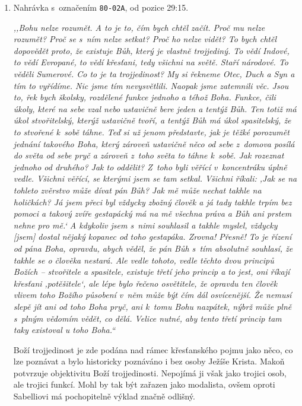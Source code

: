 \begin{enumerate}

\item{%
Nahrávka s~označením \texttt{80-02A}, od pozice 29:15.

\textit{%
,,Bohu nelze rozumět. A to je to, čím bych chtěl začít. Proč mu nelze rozumět?
Proč se s~ním
nelze setkat? Proč ho nelze vidět? To bych chtěl dopovědět proto, že existuje
Bůh,
který je vlastně trojjediný. To vědí Indové, to vědí Evropané, to vědí křesťani,
tedy všichni na světě. Staří národové. To věděli Sumerové. Co to je ta
trojjedinost? My si řekneme Otec, Duch a Syn a tím to
vyřídíme. Nic jsme tím nevysvětlili. Naopak jsme zatemnili věc. Jsou to, řek bych
školsky, rozdělené funkce jednoho a téhož Boha. Funkce, čili úkoly, které na sebe
vzal nebo ustavičně bere jeden a tentýž Bůh. Ten totiž má úkol stvořitelský,
kterýž ustavičně tvoří, a tentýž Bůh má úkol spasitelský, že to stvořené k~sobě
táhne. Teď si už jenom představte, jak je těžké porozumět jednání takového Boha,
který zároveň ustavičně něco od sebe z~domova posílá do světa od sebe pryč a zároveň
z~toho světa to táhne k~sobě. Jak rozeznat jednoho od druhého? Jak to oddělit?
Z~toho byli věřící
v~koncentráku úplně vedle. Všichni věřící, se kterými jsem se tam setkal.
Všichni říkali: ,Jak se
na tohleto zvěrstvo může dívat pán Bůh? Jak mě může nechat takhle na holičkách?
Já
jsem přeci byl vždycky zbožný člověk a já tady takhle trpím bez pomoci a takový
zvíře gestapácký má na mě všechna práva a Bůh ani prstem nehne pro mě.` A kdykoliv
jsem s~nimi souhlasil a takhle myslel, vždycky [jsem] dostal nějaký kopanec od
toho gestapáka. Zrovna! Přesně! To je řízení od pána Boha, opravdu, abych věděl, že
pán Bůh s~tím absolutně souhlasí, že takhle se o člověka nestará. Ale vedle
tohoto,
vedle těchto dvou principů Božích -- stvořitele a spasitele, existuje třetí jeho princip a
to jest, oni říkají křesťani ,potěšitele`, ale lépe bylo řečeno osvětitele, že
opravdu ten člověk vlivem toho Božího působení v~něm může být čím dál
osvícenější. Že nemusí slepě jít ani od toho Boha pryč, ani k~tomu Bohu
nazpátek,
nýbrž může plně s~plným vědomím vědět, co dělá. Velice nutné, aby tento třetí
princip tam taky existoval u toho Boha.``
}

Boží trojjedinost je zde podána nad rámec křesťanského pojmu jako něco, co lze
        poznávat a bylo historicky poznáváno i bez osoby Ježíše Krista. Makoň
        potvrzuje objektivitu Boží trojjedinosti. Nepojímá ji však jako trojici
        osob, ale trojici funkcí. Mohl by tak být zařazen jako modalista, ovšem
        oproti Sabelliovi má pochopitelně výklad značně odlišný.

}
\end{enumerate}
